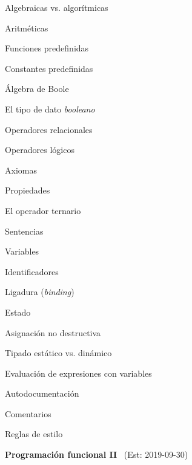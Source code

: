 \begin{longenum}
\begin{longenum}
\begin{longenum}
\begin{longenum}
\begin{longenum}
                \end{longenum}
            \end{longenum}
            \item Algebraicas vs. algorítmicas
            \item Aritméticas
            \item Funciones predefinidas
            \item Constantes predefinidas
        \end{longenum}
        \item Álgebra de Boole
        \begin{longenum}
            \item El tipo de dato \textit{booleano}
            \item Operadores relacionales
            \item Operadores lógicos
            \item Axiomas
            \item Propiedades
            \item El operador ternario
        \end{longenum}
        \item Sentencias
        \begin{longenum}
            \item Variables
            \begin{longenum}
                \item Identificadores
                \item Ligadura (\textit{binding})
                \item Estado
                \item Asignación no destructiva
                \item Tipado estático vs. dinámico
            \end{longenum}
            \item Evaluación de expresiones con variables
        \end{longenum}
        \item Autodocumentación
        \begin{longenum}
            \item Comentarios
            \item Reglas de estilo
        \end{longenum}
    \end{longenum}
    \item \textbf{Programación funcional II} \ (Est: 2019-09-30)

\end{longenum}
